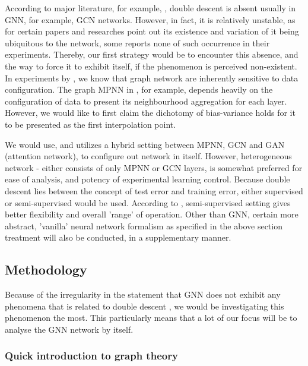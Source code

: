 \documentclass{article}
\begin{document}
According to major literature, for example, \cite{shi2024homophilymodulatesdoubledescent}, double descent is absent usually in GNN, for example, GCN networks. However, in fact, it is relatively unstable, as for certain papers and researches point out its existence and variation of it being ubiquitous to the network, some reports none of such occurrence in their experiments. Thereby, our first strategy would be to encounter this absence, and the way to force it to exhibit itself, if the phenomenon is perceived non-existent. In experiments by \cite{shi2024homophilymodulatesdoubledescent,buschjager_generalized_2020}, we know that graph network are inherently sensitive to data configuration. The graph MPNN in \cite{GRP_Hamilton}, for example, depends heavily on the configuration of data to present its neighbourhood aggregation for each layer. However, we would like to first claim the dichotomy of bias-variance holds for it to be presented as the first interpolation point.

We would use, and utilizes a hybrid setting between MPNN, GCN and GAN (attention network), to configure out network in itself. However, heterogeneous network - either consists of only MPNN or GCN layers, is somewhat preferred for ease of analysis, and potency of experimental learning control. Because double descent lies between the concept of test error and training error, either supervised or semi-supervised would be used. According to \cite{shi2024homophilymodulatesdoubledescent}, semi-supervised setting gives better flexibility and overall 'range' of operation. Other than GNN, certain more abstract, 'vanilla' neural network formalism as specified in the above section treatment will also be conducted, in a supplementary manner. 

\subsection{Methodology}

Because of the irregularity in the statement that GNN does not exhibit any phenomena that is related to double descent \cite{shi2024homophilymodulatesdoubledescent}, we would be investigating this phenomenon the most. This particularly means that a lot of our focus will be to analyse the GNN network by itself. 

\subsubsection{Quick introduction to graph theory}
\end{document}
